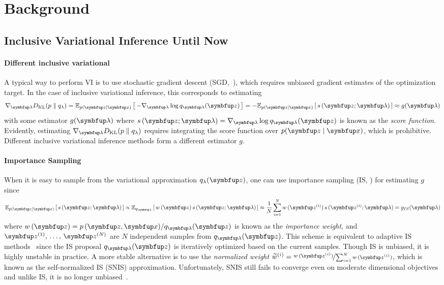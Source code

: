 
\section{Background}
\subsection{Inclusive Variational Inference Until Now}\label{section:ivi_previous}
\paragraph{Different inclusive variational}
A typical way to perform VI is to use stochastic gradient descent (SGD,~\citealt{robbins_stochastic_1951, bottou_online_1999}), which requires unbiased gradient estimates of the optimization target.
In the case of inclusive variational inference, this corresponds to estimating
%
\begin{align}
  \nabla_{\vlambda} \DKL{p}{q_{\lambda}}
  = \Esub{p(\vz\mid\vx)}{ - \nabla_{\vlambda} \log q_{\vlambda}(\vz) }
  = - \Esub{p(\vz\mid\vx)}{ s\,(\vz; \vlambda) }
  \approx g(\vlambda)
\end{align}
with some estimator \(g(\vlambda)\) where \(s\,(\vz; \vlambda) = \nabla_{\vlambda} \log q_{\vlambda}(\vz)\) is known as the \textit{score function}.
Evidently, estimating \(\nabla_{\vlambda} \DKL{p}{q_{\lambda}}\) requires integrating the score function over \(p(\vz\mid\vx)\), which is prohibitive.
Different inclusive variational inference methods form a different estimator \(g\).

\paragraph{Importance Sampling}
When it is easy to sample from the variational approximation \(q_{\lambda}(\vz)\), one can use importance sampling (IS, \citealt{robert_monte_2004, mcbook}) for estimating \(g\) since 
\begin{align}
  \Esub{p(\vz\mid\vx)}{ s\,(\vz; \vlambda) }
  \propto \Esub{q_{\vlambda}}{ w\,(\vz) \, s\,(\vz; \vlambda) }
  \approx \frac{1}{N} \sum^{N}_{i=1} w\,(\vz^{(i)}) \, s\,(\vz^{(i)}; \vlambda)
  = g_{IS}(\vlambda)
\end{align}
where \(w\,(\vz) = p\,(\vz,\vx) / q_{\vlambda}(\vz)\) is known as the \textit{importance weight}, and \(\vz^{(1)},\, \ldots,\, \vz^{(N)}\) are \(N\) independent samples from \(q_{\vlambda}(\vz)\).
This scheme is equivalent to adaptive IS methods~\citep{cappe_adaptive_2008, bugallo_adaptive_2017} since the IS proposal \(q_{\vlambda}(\vz)\) is iteratively optimized based on the current samples.
Though IS is unbiased, it is highly unstable in practice.
A more stable alternative is to use the \textit{normalized weight} \(\widetilde{w}^{(i)} = \nicefrac{w\,(\vz^{(i)})}{\sum_{i=1}^N w\,(\vz^{(i)}) }\), which is known as the self-normalized IS (SNIS) approximation.
Unfortunately, SNIS still fails to converge even on moderate dimensional objectives and unlike IS, it is no longer unbiased~\citep{robert_monte_2004, mcbook}.

